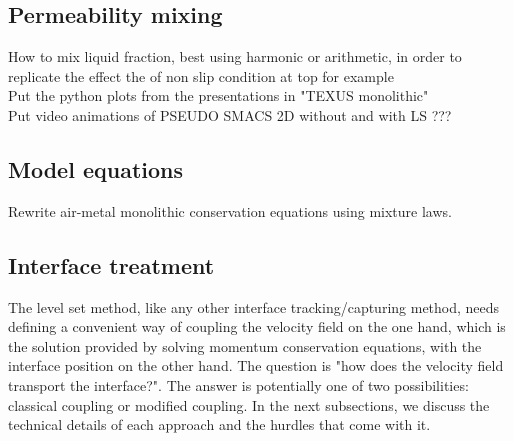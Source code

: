 \subsection{Permeability mixing}
How to mix liquid fraction, best using harmonic or arithmetic, in order to replicate the effect the of non slip condition at top for example \\
Put the python plots from the presentations in "TEXUS monolithic" \\
Put video animations of PSEUDO SMACS 2D without and with LS ???
\subsection{Model equations}
Rewrite air-metal monolithic conservation equations using mixture laws.
\subsection{Interface treatment}
%
The level set method, like any other interface tracking/capturing method, needs defining a convenient way of coupling
the velocity field on the one hand, which is the solution provided by solving momentum conservation equations, with the 
interface position on the other hand. The question is "how does the velocity field transport the interface?". The answer
is potentially one of two possibilities: classical coupling or modified coupling. In the next subsections, we discuss
the technical details of each approach and the hurdles that come with it.
